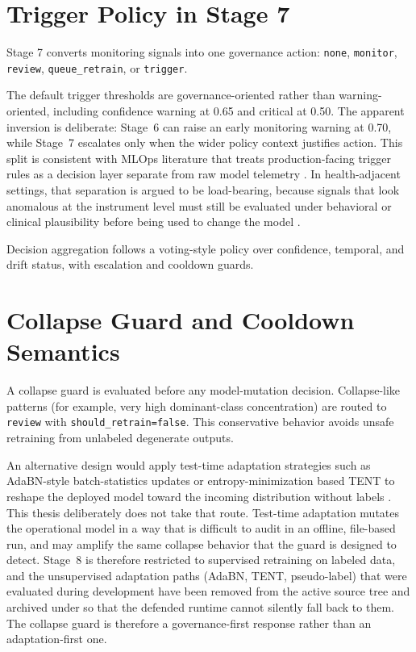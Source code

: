 \section{Trigger Policy in Stage 7}

Stage 7 converts monitoring signals into one governance action:
\texttt{none}, \texttt{monitor}, \texttt{review}, \texttt{queue\_retrain}, or \texttt{trigger}.

The default trigger thresholds are governance-oriented rather than warning-oriented, including confidence warning at 0.65 and critical at 0.50. The apparent inversion is deliberate: Stage~6 can raise an early monitoring warning at 0.70, while Stage~7 escalates only when the wider policy context justifies action. This split is consistent with MLOps literature that treats production-facing trigger rules as a decision layer separate from raw model telemetry \cite{amershi2019mlops,kreuzberger2023mlops}. In health-adjacent settings, that separation is argued to be load-bearing, because signals that look anomalous at the instrument level must still be evaluated under behavioral or clinical plausibility before being used to change the model \cite{khattak2023mlhops}.

Decision aggregation follows a voting-style policy over confidence, temporal, and drift status, with escalation and cooldown guards.

\section{Collapse Guard and Cooldown Semantics}

A collapse guard is evaluated before any model-mutation decision. Collapse-like patterns (for example, very high dominant-class concentration) are routed to \texttt{review} with \texttt{should\_retrain=false}. This conservative behavior avoids unsafe retraining from unlabeled degenerate outputs.

An alternative design would apply test-time adaptation strategies such as AdaBN-style batch-statistics updates or entropy-minimization based TENT to reshape the deployed model toward the incoming distribution without labels \cite{li2016adabn,wang2021tent}. This thesis deliberately does not take that route. Test-time adaptation mutates the operational model in a way that is difficult to audit in an offline, file-based run, and may amplify the same collapse behavior that the guard is designed to detect. Stage~8 is therefore restricted to supervised retraining on labeled data, and the unsupervised adaptation paths (AdaBN, TENT, pseudo-label) that were evaluated during development have been removed from the active source tree and archived under  so that the defended runtime cannot silently fall back to them. The collapse guard is therefore a governance-first response rather than an adaptation-first one.

